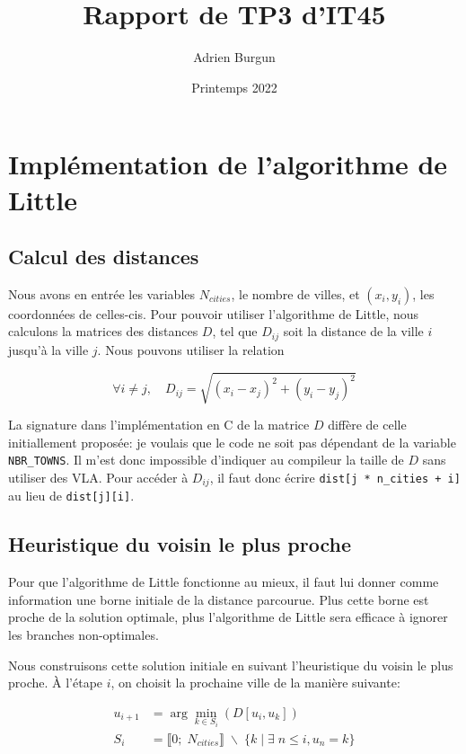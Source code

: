 \documentclass[12pt]{article}
\title{Rapport de TP3 d'IT45}
\author{Adrien Burgun}
\date{Printemps 2022}
\begin{document}
\maketitle

\section{Implémentation de l'algorithme de Little}

\subsection{Calcul des distances}

Nous avons en entrée les variables $N_{cities}$, le nombre de villes, et $(x_i, y_i)$, les coordonnées de celles-cis.
Pour pouvoir utiliser l'algorithme de Little, nous calculons la matrices des distances $D$, tel que $D_{ij}$ soit la distance de la ville $i$ jusqu'à la ville $j$.
Nous pouvons utiliser la relation

\[
  \forall i \neq j, \quad D_{ij} = \sqrt{(x_i - x_j)^2 + (y_i - y_j)^2}
\]

La signature dans l'implémentation en C de la matrice $D$ diffère de celle initiallement proposée: je voulais que le code ne soit pas dépendant de la variable \texttt{NBR\_TOWNS}. Il m'est donc impossible d'indiquer au compileur la taille de $D$ sans utiliser des VLA.
Pour accéder à $D_{ij}$, il faut donc écrire \texttt{dist[j * n\_cities + i]} au lieu de \texttt{dist[j][i]}.



\subsection{Heuristique du voisin le plus proche}

Pour que l'algorithme de Little fonctionne au mieux, il faut lui donner comme information une borne initiale de la distance parcourue.
Plus cette borne est proche de la solution optimale, plus l'algorithme de Little sera efficace à ignorer les branches non-optimales.

Nous construisons cette solution initiale en suivant l'heuristique du voisin le plus proche.
À l'étape $i$, on choisit la prochaine ville de la manière suivante:

\begin{align*}
  u_{i+1} &= \arg \min_{k \in S_i}(D[u_i,u_k]) \\
  S_i &= \llbracket 0; \; N_{cities} \rrbracket \; \backslash \; \{ k \;|\; \exists \; n \le i, u_n = k \}
\end{align*}
\end{document}
